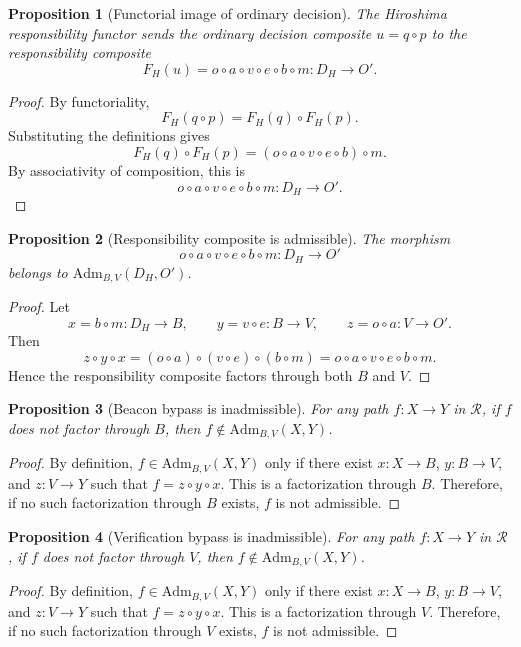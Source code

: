 \documentclass[11pt]{article}
\newtheorem{proposition}{Proposition}
\begin{document}
\begin{proposition}[Functorial image of ordinary decision]
The Hiroshima responsibility functor sends the ordinary decision composite
$u=q\circ p$ to the responsibility composite
\[
  F_H(u)
  =
  o\circ a\circ v\circ e\circ b\circ m
  :
  D_H\to O'.
\]
\end{proposition}

\begin{proof}
By functoriality,
\[
  F_H(q\circ p)=F_H(q)\circ F_H(p).
\]
Substituting the definitions gives
\[
  F_H(q)\circ F_H(p)
  =
  (o\circ a\circ v\circ e\circ b)\circ m.
\]
By associativity of composition, this is
\[
  o\circ a\circ v\circ e\circ b\circ m:D_H\to O'.
\]
\end{proof}

\begin{proposition}[Responsibility composite is admissible]
The morphism
\[
  o\circ a\circ v\circ e\circ b\circ m:D_H\to O'
\]
belongs to $\mathrm{Adm}_{B,V}(D_H,O')$.
\end{proposition}

\begin{proof}
Let
\[
  x=b\circ m:D_H\to B,\qquad
  y=v\circ e:B\to V,\qquad
  z=o\circ a:V\to O'.
\]
Then
\[
  z\circ y\circ x
  =
  (o\circ a)\circ(v\circ e)\circ(b\circ m)
  =
  o\circ a\circ v\circ e\circ b\circ m.
\]
Hence the responsibility composite factors through both $B$ and $V$.
\end{proof}

\begin{proposition}[Beacon bypass is inadmissible]
For any path $f:X\to Y$ in $\mathcal{R}$, if $f$ does not factor through $B$,
then $f\notin \mathrm{Adm}_{B,V}(X,Y)$.
\end{proposition}

\begin{proof}
By definition, $f\in\mathrm{Adm}_{B,V}(X,Y)$ only if there exist
$x:X\to B$, $y:B\to V$, and $z:V\to Y$ such that
$f=z\circ y\circ x$.  This is a factorization through $B$.  Therefore, if no
such factorization through $B$ exists, $f$ is not admissible.
\end{proof}

\begin{proposition}[Verification bypass is inadmissible]
For any path $f:X\to Y$ in $\mathcal{R}$, if $f$ does not factor through $V$,
then $f\notin \mathrm{Adm}_{B,V}(X,Y)$.
\end{proposition}

\begin{proof}
By definition, $f\in\mathrm{Adm}_{B,V}(X,Y)$ only if there exist
$x:X\to B$, $y:B\to V$, and $z:V\to Y$ such that
$f=z\circ y\circ x$.  This is a factorization through $V$.  Therefore, if no
such factorization through $V$ exists, $f$ is not admissible.
\end{proof}
\end{document}

